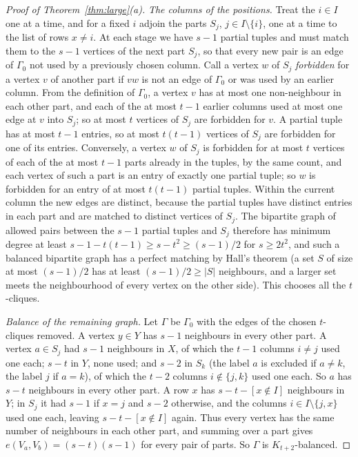 \documentclass[11pt]{amsart}
\theoremstyle{definition}\newtheorem{definition}[theorem]{Definition}
\theoremstyle{remark}\newtheorem{remark}[theorem]{Remark}
\begin{document}
\begin{proof}[Proof of Theorem~\ref{thm:large}(a)]
\emph{The columns of the positions.} Treat the $i\in I$ one at a time, and for a fixed $i$ adjoin the parts $S_j$,
$j\in I\setminus\{i\}$, one at a time to the list of rows $x\ne i$. At each stage we have $s-1$ partial tuples and must
match them to the $s-1$ vertices of the next part $S_j$, so that every new pair is an edge of $\Gamma_0$ not used by a
previously chosen column. Call a vertex $w$ of $S_j$ \emph{forbidden} for a vertex $v$ of another part if $vw$ is not
an edge of $\Gamma_0$ or was used by an earlier column. From the definition of $\Gamma_0$, a vertex $v$ has at most one
non-neighbour in each other part, and each of the at most $t-1$ earlier columns used at most one edge at $v$ into
$S_j$; so at most $t$ vertices of $S_j$ are forbidden for $v$. A partial tuple has at most $t-1$ entries, so at most
$t(t-1)$ vertices of $S_j$ are forbidden for one of its entries. Conversely, a vertex $w$ of $S_j$ is forbidden for at
most $t$ vertices of each of the at most $t-1$ parts already in the tuples, by the same count, and each vertex of
such a part is an entry of exactly one partial tuple; so $w$ is forbidden for an entry of at most $t(t-1)$ partial
tuples. Within the current column the new edges are distinct, because the partial tuples have distinct entries in each
part and are matched to distinct vertices of $S_j$. The bipartite graph of allowed pairs between the $s-1$ partial
tuples and $S_j$ therefore has minimum degree at least $s-1-t(t-1)\ge s-t^2\ge(s-1)/2$ for $s\ge2t^2$, and such a balanced bipartite graph has a perfect matching by Hall's
theorem (a set $S$ of size at most $(s-1)/2$ has at least $(s-1)/2\ge|S|$ neighbours, and a larger set meets the
neighbourhood of every vertex on the other side). This chooses all the $t$-cliques.

\emph{Balance of the remaining graph.} Let $\Gamma$ be $\Gamma_0$ with the edges of the chosen $t$-cliques removed. A
vertex $y\in Y$ has $s-1$ neighbours in every other part. A vertex $a\in S_j$ had $s-1$ neighbours in $X$, of which
the $t-1$ columns $i\ne j$ used one each; $s-t$ in $Y$, none used; and $s-2$ in $S_k$ (the label $a$ is excluded if
$a\ne k$, the label $j$ if $a=k$), of which the $t-2$ columns $i\notin\{j,k\}$ used one each. So $a$ has $s-t$
neighbours in every other part. A row $x$ has $s-t-[x\notin I]$ neighbours in $Y$; in $S_j$ it had $s-1$ if $x=j$ and
$s-2$ otherwise, and the columns $i\in I\setminus\{j,x\}$ used one each, leaving $s-t-[x\notin I]$ again. Thus every
vertex has the same number of neighbours in each other part, and summing over a part gives
$e(V_a,V_b)=(s-t)(s-1)$ for every pair of parts. So $\Gamma$ is $K_{t+2}$-balanced.


\end{proof}
\end{document}
